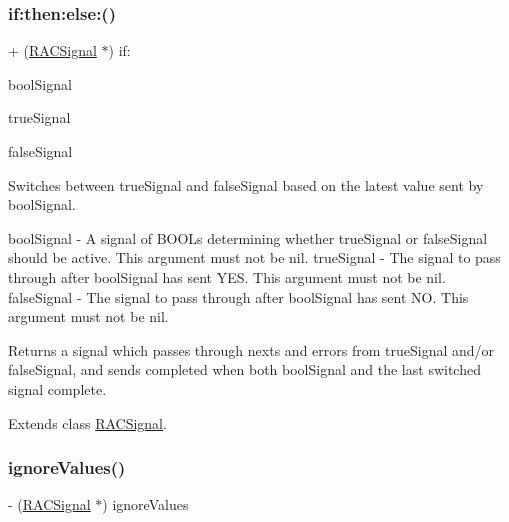 \subsubsection{\texorpdfstring{if\+:then\+:else\+:()}{if:then:else:()}\hspace{0.1cm}{\footnotesize\ttfamily [3/3]}}
{\footnotesize\ttfamily + (\mbox{\hyperlink{interface_r_a_c_signal}{R\+A\+C\+Signal}} $\ast$) if\+: \begin{DoxyParamCaption}\item[{(\mbox{\hyperlink{interface_r_a_c_signal}{R\+A\+C\+Signal}} $\ast$)}]{bool\+Signal }\item[{then:(\mbox{\hyperlink{interface_r_a_c_signal}{R\+A\+C\+Signal}} $\ast$)}]{true\+Signal }\item[{else:(\mbox{\hyperlink{interface_r_a_c_signal}{R\+A\+C\+Signal}} $\ast$)}]{false\+Signal }\end{DoxyParamCaption}}

Switches between {\ttfamily true\+Signal} and {\ttfamily false\+Signal} based on the latest value sent by {\ttfamily bool\+Signal}.

bool\+Signal -\/ A signal of B\+O\+O\+Ls determining whether {\ttfamily true\+Signal} or {\ttfamily false\+Signal} should be active. This argument must not be nil. true\+Signal -\/ The signal to pass through after {\ttfamily bool\+Signal} has sent Y\+ES. This argument must not be nil. false\+Signal -\/ The signal to pass through after {\ttfamily bool\+Signal} has sent NO. This argument must not be nil.

Returns a signal which passes through {\ttfamily next}s and {\ttfamily error}s from {\ttfamily true\+Signal} and/or {\ttfamily false\+Signal}, and sends {\ttfamily completed} when both {\ttfamily bool\+Signal} and the last switched signal complete. 

Extends class \mbox{\hyperlink{interface_r_a_c_signal_a67c14dfcf505999bc53632e336f6cb84}{R\+A\+C\+Signal}}.

\mbox{\label{category_r_a_c_signal_07_operations_08_a2997862d443d16efa3197facb6a354d1}} 
\subsubsection{\texorpdfstring{ignore\+Values()}{ignoreValues()}\hspace{0.1cm}{\footnotesize\ttfamily [1/3]}}
{\footnotesize\ttfamily -\/ (\mbox{\hyperlink{interface_r_a_c_signal}{R\+A\+C\+Signal}} $\ast$) ignore\+Values \begin{DoxyParamCaption}{ }\end{DoxyParamCaption}}

